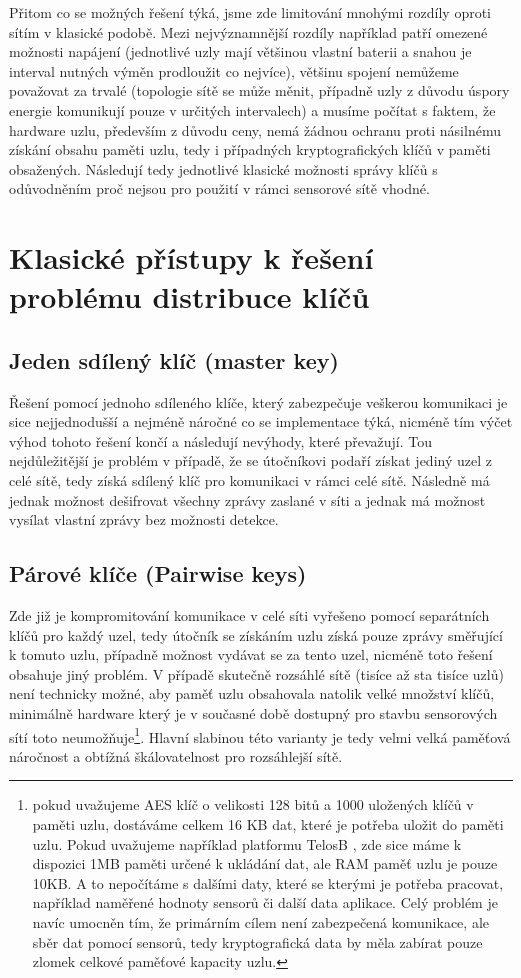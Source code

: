 \documentclass[11pt,final,twoside]{fithesis2}
\begin{document}
Přitom co se možných řešení týká, jsme zde limitování mnohými rozdíly oproti sítím v klasické podobě. Mezi nejvýznamnější rozdíly například
patří omezené možnosti napájení (jednotlivé uzly mají většinou vlastní baterii a snahou je interval nutných výměn prodloužit co nejvíce), 
většinu spojení nemůžeme považovat za trvalé (topologie sítě se může měnit, případně uzly z důvodu úspory energie komunikují pouze v určitých 
intervalech) a musíme počítat s faktem, že hardware uzlu, především z důvodu ceny, nemá žádnou ochranu proti násilnému získání obsahu paměti uzlu, 
tedy i případných kryptografických klíčů v paměti obsažených. Následují tedy jednotlivé klasické možnosti správy klíčů s odůvodněním proč nejsou pro 
použití v rámci sensorové sítě vhodné.

\section{Klasické přístupy k řešení problému distribuce klíčů}
\subsection{Jeden sdílený klíč (master key)} Řešení pomocí jednoho sdíleného klíče, který zabezpečuje veškerou komunikaci je sice nejjednodušší a 
nejméně náročné co se implementace týká, nicméně tím výčet výhod tohoto řešení končí a následují nevýhody, které převažují. Tou nejdůležitější 
je problém v případě, že se útočníkovi podaří získat jediný uzel z celé sítě, tedy získá sdílený klíč pro komunikaci v rámci celé sítě. Následně 
má jednak možnost dešifrovat všechny zprávy zaslané v síti a jednak má možnost vysílat vlastní zprávy bez možnosti detekce.

\subsection{Párové klíče (Pairwise keys)} Zde již je kompromitování komunikace v celé síti vyřešeno pomocí separátních klíčů pro každý uzel, 
tedy útočník se získáním uzlu získá pouze zprávy směřující k tomuto uzlu, případně možnost vydávat se za tento uzel, nicméně toto řešení 
obsahuje jiný problém. V případě skutečně rozsáhlé sítě (tisíce až sta tisíce uzlů) není technicky možné, aby paměť uzlu obsahovala natolik 
velké množství klíčů, minimálně hardware který je v současné době dostupný pro stavbu sensorových sítí toto neumožňuje\footnote{pokud uvažujeme 
AES \cite{Daemen1999} klíč o velikosti 128 bitů a 1000 uložených klíčů v paměti uzlu, dostáváme celkem 16 KB dat, které je potřeba uložit do paměti uzlu. 
Pokud uvažujeme například platformu TelosB \cite{MemsicInc.}, zde sice máme k dispozici 1MB paměti určené k ukládání dat, ale RAM paměť uzlu je pouze 10KB. 
A to nepočítáme s dalšími daty, které se kterými je potřeba pracovat, například naměřené hodnoty sensorů či další data aplikace. Celý problém je navíc umocněn tím, že
primárním cílem není zabezpečená komunikace, ale sběr dat pomocí sensorů, tedy kryptografická data by měla zabírat pouze zlomek celkové paměťové kapacity uzlu.}.
Hlavní slabinou této varianty je tedy velmi velká paměťová náročnost a obtížná škálovatelnost pro rozsáhlejší sítě. 
\end{document}
